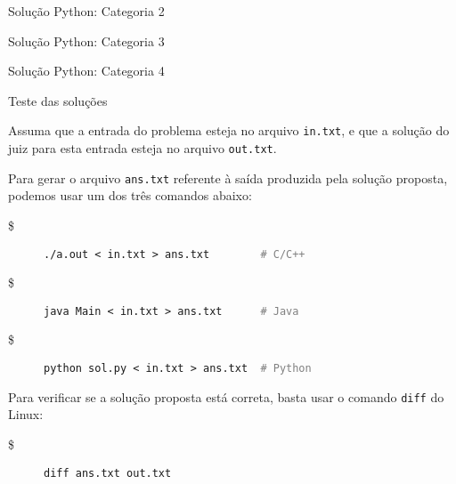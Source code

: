\begin{frame}[fragile]{Solução Python: Categoria 2}
\end{frame}

\begin{frame}[fragile]{Solução Python: Categoria 3}
\end{frame}

\begin{frame}[fragile]{Solução Python: Categoria 4}
\end{frame}


\begin{frame}[fragile]{Teste das soluções}

    Assuma que a entrada do problema esteja no arquivo \texttt{in.txt}, e que a solução do 
    juiz para esta entrada esteja no arquivo \texttt{out.txt}.

    Para gerar o arquivo \texttt{ans.txt} referente à saída produzida pela solução proposta,
    podemos usar um dos três comandos abaixo:

    \begin{description}
        \item[\$] \texttt{./a.out < in.txt > ans.txt  \textcolor{gray}{\ \ \ \ \ \ \  \# C/C++}}
        \item[\$] \texttt{java Main < in.txt > ans.txt  \textcolor{gray}{\ \ \ \ \ \# Java}}
        \item[\$] \texttt{python sol.py < in.txt > ans.txt  \textcolor{gray}{\ \# Python}}
    \end{description}

    Para verificar se a solução proposta está correta, basta usar o comando \texttt{diff} do
    Linux:

    \begin{description}
        \item[\$] \texttt{diff ans.txt out.txt}
    \end{description}

\end{frame}
